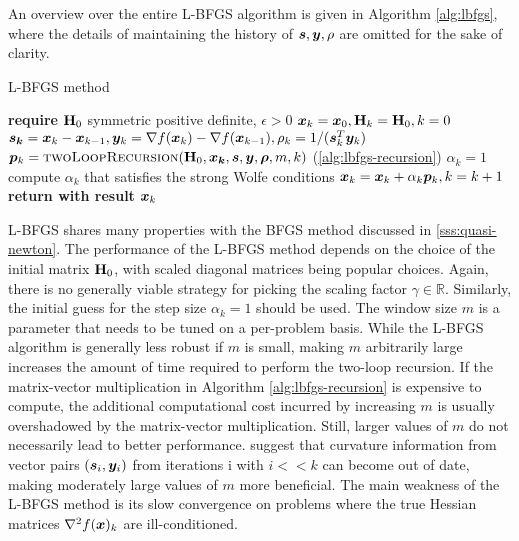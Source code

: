 An overview over the entire L-BFGS algorithm is given in Algorithm \ref{alg:lbfgs}, where the details of maintaining the history
of $\bm{s}, \bm{y}, \rho$ are omitted for the sake of clarity.

\begin{algorithm}
\caption{L-BFGS method}\label{alg:lbfgs}
\begin{algorithmic}
\State \textbf{require } $\mathbf{H}_0$ symmetric positive definite, $\epsilon > 0$
\State $\bm{x}_k = \bm{x}_0, \mathbf{H}_k = \mathbf{H}_0, k=0$
\State $\bm{s_k} = \bm{x}_k - \bm{x}_{k-1}, \bm{y}_k = \nabla f(\bm{x}_k) - \nabla f(\bm{x}_{k-1}), \rho_k = 1 / (\bm{s}^T_k \bm{y}_k)$
\State $\bm{p}_k = \text{\textsc{twoLoopRecursion}}(\mathbf{H}_0, \bm{x_k}, \bm{s}, \bm{y}, \bm{\rho}, m, k)$   (\cref{alg:lbfgs-recursion})
\State $\alpha_k = 1$
\State compute $\alpha_k$ that satisfies the strong Wolfe conditions
\EndIf
\State $\bm{x}_k = \bm{x}_k + \alpha_k \bm{p}_k, k = k + 1$
\EndWhile
\State \textbf{return with result } $\bm{x}_k$
\EndProcedure
\end{algorithmic}
\end{algorithm}

L-BFGS shares many properties with the BFGS method discussed in \cref{sss:quasi-newton}. The performance of the L-BFGS method depends 
on the choice of the initial matrix $\mathbf{H}_0$, with scaled diagonal matrices being popular choices. Again, there is no generally viable
strategy for picking the scaling factor $\gamma \in \mathbb{R}$. Similarly, the initial guess for the step size $\alpha_k=1$ should be used.
The window size $m$ is a parameter that needs to be tuned on a per-problem basis. While the L-BFGS algorithm is 
generally less robust if
$m$ is small, making $m$ arbitrarily large increases the amount of time required to perform the two-loop recursion. If the matrix-vector
multiplication in Algorithm \ref{alg:lbfgs-recursion} is expensive to compute, the additional computational cost incurred by increasing $m$ is 
usually overshadowed by the matrix-vector multiplication. Still, larger values of $m$ do not necessarily lead to better performance. 
\cite{liu2017} suggest that curvature information from vector pairs $(\bm{s}_i, \bm{y}_i)$ from iterations i with $i << k$ can become 
out of date, making moderately large values of $m$ more beneficial. The main weakness of the L-BFGS method is its slow convergence on 
problems where the true Hessian matrices $\nabla^2 f(\bm{x})_k$ are ill-conditioned.

